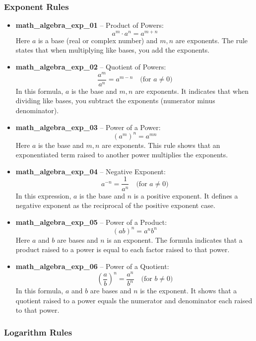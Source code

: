 \documentclass[11pt,a4paper]{article}
\begin{document}
\subsubsection{Exponent Rules}

\begin{itemize}
\item \textbf{math\_algebra\_exp\_01} -- Product of Powers: 
\[a^m \cdot a^n = a^{m+n}\]
Here $a$ is a base (real or complex number) and $m,n$ are exponents. The rule states that when multiplying like bases, you add the exponents.

\item \textbf{math\_algebra\_exp\_02} -- Quotient of Powers: 
\[\frac{a^m}{a^n} = a^{m-n} \quad \text{(for } a \neq 0\text{)}\]
In this formula, $a$ is the base and $m,n$ are exponents. It indicates that when dividing like bases, you subtract the exponents (numerator minus denominator).

\item \textbf{math\_algebra\_exp\_03} -- Power of a Power: 
\[(a^m)^n = a^{mn}\]
Here $a$ is the base and $m,n$ are exponents. This rule shows that an exponentiated term raised to another power multiplies the exponents.

\item \textbf{math\_algebra\_exp\_04} -- Negative Exponent: 
\[a^{-n} = \frac{1}{a^n} \quad \text{(for } a \neq 0\text{)}\]
In this expression, $a$ is the base and $n$ is a positive exponent. It defines a negative exponent as the reciprocal of the positive exponent case.

\item \textbf{math\_algebra\_exp\_05} -- Power of a Product: 
\[(ab)^n = a^n b^n\]
Here $a$ and $b$ are bases and $n$ is an exponent. The formula indicates that a product raised to a power is equal to each factor raised to that power.

\item \textbf{math\_algebra\_exp\_06} -- Power of a Quotient: 
\[\left(\frac{a}{b}\right)^n = \frac{a^n}{b^n} \quad \text{(for } b \neq 0\text{)}\]
In this formula, $a$ and $b$ are bases and $n$ is the exponent. It shows that a quotient raised to a power equals the numerator and denominator each raised to that power.
\end{itemize}

\subsubsection{Logarithm Rules}
\end{document}
